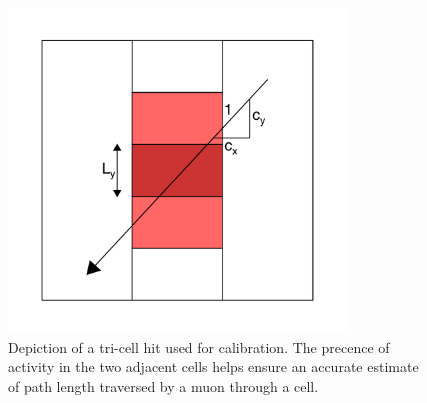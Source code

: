 \begin{figure}[t]
\begin{center}
\includegraphics[width=0.8\textwidth]{figures/plots/reco/calib_tricell}
\end{center}
\caption{Depiction of a tri-cell hit used for calibration.  The precence of
activity in the two adjacent cells helps ensure an accurate estimate of
path length traversed by a muon through a cell.}
\label{calib_tricell}
\end{figure}

